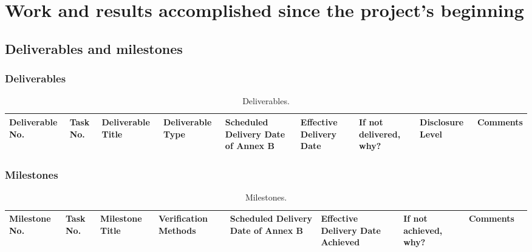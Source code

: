 \documentclass{ani}
\begin{document}
\chapter{Work and results accomplished since the project's beginning}
\lipsum[5-9]

  \section{Deliverables and milestones}
  \subsection{Deliverables}
  \lipsum[10-12]

  \newpage
  \begin{landscape}
    
    \begin{table}
      \centering
      \scriptsize
      \begin{tabular}{|p{}|p{}|p{}|p{}|p{}|p{}|p{}|p{}|p{}|}
        \hline
        Deliverable No. & Task No. & Deliverable Title & Deliverable Type & Scheduled Delivery Date of Annex B & Effective Delivery Date & If not delivered, why? & Disclosure Level & Comments \\ \hline
      \end{tabular}
      \caption{Deliverables.}
    \end{table}
  \end{landscape}
  
  \newpage
  \subsection{Milestones}
  \lipsum[10-12]

  \newpage
  \begin{landscape}
    \begin{table}
      \center
      \scriptsize
      \begin{tabular}{|p{}|p{}|p{}|p{}|p{}|p{}|p{}|p{}|p{}|}
        \hline
        Milestone No. & Task No. & Milestone Title & Verification Methods & Scheduled Delivery Date of Annex B & Effective Delivery Date Achieved & If not achieved, why? & Comments \\ \hline
      \end{tabular}
      \caption{Milestones.}
    \end{table}
  \end{landscape}
  \newpage
\end{document}
